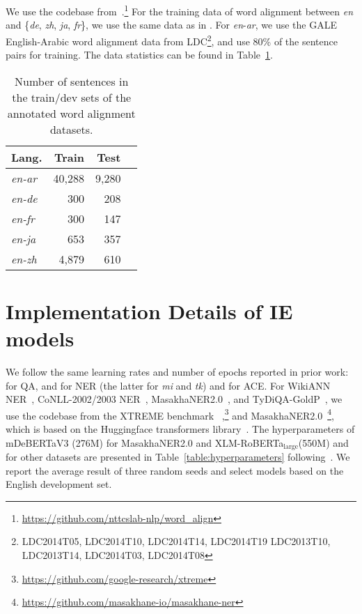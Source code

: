 \documentclass[11pt,dvipsnames]{article}
\begin{document}
We use the codebase from~\citet{nagata2020supervised}.\footnote{\url{https://github.com/nttcslab-nlp/word_align}} For the  training data of word alignment between  \textit{en} and \{\textit{de}, \textit{zh}, \textit{ja}, \textit{fr}\}, we use the same data as in \citet{nagata2020supervised}. For \textit{en}-\textit{ar}, we use the GALE English-Arabic word alignment data from LDC\footnote{LDC2014T05, LDC2014T10, LDC2014T14, LDC2014T19 LDC2013T10, LDC2013T14, LDC2014T03, LDC2014T08},  and use 80\% of the sentence pairs for training. The data statistics can be found in Table~\ref{table:qaalign}.







\renewcommand{\arraystretch}{1.20}
\begin{table}[t!]
\centering
\small
\begin{tabular}{lrrr}
\toprule
Lang. & Train & Test \\
\midrule
\textit{en-ar} &40,288&9,280\\
\textit{en-de} &300&208\\
\textit{en-fr} &300&147\\
\textit{en-ja} &653&357\\
\textit{en-zh} &4,879&610\\
\bottomrule
\end{tabular}
\vspace{-5pt}
\caption{Number of sentences in the  train/dev sets of the annotated  word alignment datasets. 
}
\vspace{-15pt}
\label{table:qaalign}
\end{table}


\section{Implementation Details of IE models}
\label{appendix:implementation_details_IE}
\label{appendix:implementation}
We follow the same learning rates and number of epochs reported in prior work: \citet{hu2020xtreme} for QA, \citet{he2021effectiveness} and \citet{pfeiffer2020madx} for NER (the latter for \textit{mi} and \textit{tk}) and  \citet{wu-2021-everything} for ACE.
For WikiANN NER~\citep{pan2017wikiann}, CoNLL-2002/2003 NER~\citep{sang2002conll,sang2003conll}, MasakhaNER2.0~\citep{adelani2022masakhaner}, and TyDiQA-GoldP~\citep{clark-etal-2020-tydi}, we use the codebase from the XTREME benchmark ~\citep{hu2020xtreme},\footnote{\url{https://github.com/google-research/xtreme}} and MasakhaNER2.0~\footnote{\url{https://github.com/masakhane-io/masakhane-ner}}, which is based on the Huggingface transformers  library~\citep{wolf2019huggingface}.
The hyperparameters of mDeBERTaV3 (276M) for MasakhaNER2.0 and XLM-RoBERTa$_{\text{large}}$(550M) and  for other datasets are presented in Table~\ref{table:hyperparameters} following~\citep{hu2020xtreme,he2021effectiveness,liu-2021-mulda,adelani2022masakhaner}.
We report the average result of three random seeds and select models based on the English development set. 
\end{document}
